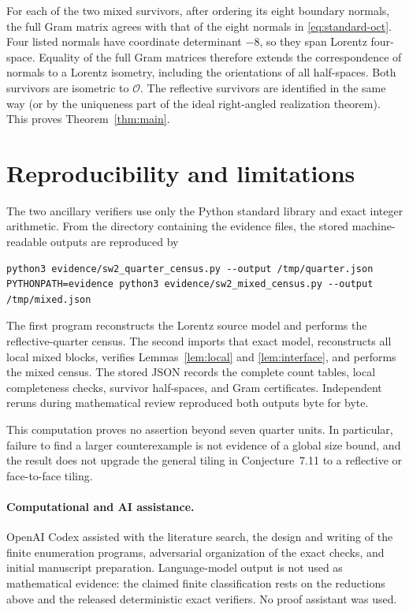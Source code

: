 \documentclass[11pt]{article}
\theoremstyle{remark}
\newcommand{\OO}{\mathcal O}
\begin{document}
For each of the two mixed survivors, after ordering its eight boundary
normals, the full Gram matrix agrees with that of the eight normals in
\eqref{eq:standard-oct}.  Four listed normals have coordinate determinant
$-8$, so they span Lorentz four-space.  Equality of the full Gram matrices
therefore extends the correspondence of normals to a Lorentz isometry,
including the orientations of all half-spaces.  Both survivors are isometric
to $\OO$.  The reflective survivors are identified in the same way (or by
the uniqueness part of the ideal right-angled realization theorem).  This
proves Theorem~\ref{thm:main}.

\section{Reproducibility and limitations}

The two ancillary verifiers use only the Python standard library and exact
integer arithmetic.  From the directory containing the evidence files, the
stored machine-readable outputs are reproduced by
\begin{verbatim}
python3 evidence/sw2_quarter_census.py --output /tmp/quarter.json
PYTHONPATH=evidence python3 evidence/sw2_mixed_census.py --output /tmp/mixed.json
\end{verbatim}
The first program reconstructs the Lorentz source model and performs the
reflective-quarter census.  The second imports that exact model, reconstructs
all local mixed blocks, verifies Lemmas~\ref{lem:local} and
\ref{lem:interface}, and performs the mixed census.  The stored JSON records
the complete count tables, local completeness checks, survivor half-spaces,
and Gram certificates.  Independent reruns during mathematical review
reproduced both outputs byte for byte.

This computation proves no assertion beyond seven quarter units.  In
particular, failure to find a larger counterexample is not evidence of a
global size bound, and the result does not upgrade the general tiling in
Conjecture~7.11 to a reflective or face-to-face tiling.

\paragraph{Computational and AI assistance.}
OpenAI Codex assisted with the literature search, the design and writing of
the finite enumeration programs, adversarial organization of the exact
checks, and initial manuscript preparation.  Language-model output is not
used as mathematical evidence: the claimed finite classification rests on
the reductions above and the released deterministic exact verifiers.  No
proof assistant was used.



\end{document}
